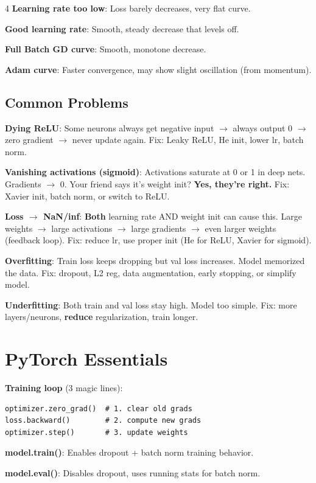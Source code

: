 \documentclass[6pt,landscape,a4paper]{extarticle}
\begin{document}
\begin{multicols}{4}
\textbf{Learning rate too low}: Loss barely decreases, very flat curve.

\textbf{Good learning rate}: Smooth, steady decrease that levels off.

\textbf{Full Batch GD curve}: Smooth, monotone decrease.

\textbf{Adam curve}: Faster convergence, may show slight oscillation (from momentum).

\subsection{Common Problems}
\textbf{Dying ReLU}: Some neurons always get negative input $\to$ always output 0 $\to$ zero gradient $\to$ never update again. Fix: Leaky ReLU, He init, lower lr, batch norm.

\textbf{Vanishing activations (sigmoid)}: Activations saturate at 0 or 1 in deep nets. Gradients $\to$ 0. Your friend says it's weight init? \textbf{Yes, they're right.} Fix: Xavier init, batch norm, or switch to ReLU.

\textbf{Loss $\to$ NaN/inf}: \textbf{Both} learning rate AND weight init can cause this. Large weights $\to$ large activations $\to$ large gradients $\to$ even larger weights (feedback loop). Fix: reduce lr, use proper init (He for ReLU, Xavier for sigmoid).

\textbf{Overfitting}: Train loss keeps dropping but val loss increases. Model memorized the data. Fix: dropout, L2 reg, data augmentation, early stopping, or simplify model.

\textbf{Underfitting}: Both train and val loss stay high. Model too simple. Fix: more layers/neurons, \textbf{reduce} regularization, train longer.

\section{PyTorch Essentials}

\textbf{Training loop} (3 magic lines):
\begin{lstlisting}
optimizer.zero_grad()  # 1. clear old grads
loss.backward()        # 2. compute new grads
optimizer.step()       # 3. update weights
\end{lstlisting}

\textbf{model.train()}: Enables dropout + batch norm training behavior.

\textbf{model.eval()}: Disables dropout, uses running stats for batch norm.


\end{multicols}
\end{document}
